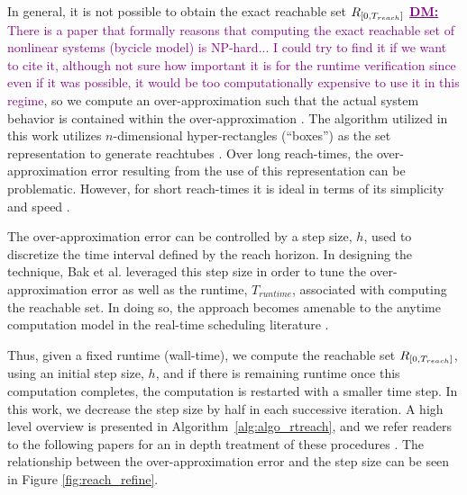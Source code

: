 \documentclass[manuscript,screen,review]{acmart}
\newcommand{\diego}[1]{\textcolor{purple}{\textbf{\underline{DM:}} #1}}
\begin{document}
In general, it is not possible to obtain the exact reachable set $\mathnormal{R}_{[0,T_{reach}]}$ \diego{There is a paper that formally reasons that computing the exact reachable set of nonlinear systems (bycicle model) is NP-hard... I could try to find it if we want to cite it, although not sure how important it is for the runtime verification since even if it was possible, it would be too computationally expensive to use it in this regime}, so we compute an over-approximation such that the actual system behavior is contained within the over-approximation \cite{Lin2020}. The algorithm utilized in this work utilizes $n$-dimensional hyper-rectangles (``boxes'') as the set representation to generate reachtubes \cite{Johnson2016}. Over long reach-times, the over-approximation error resulting from the use of this representation can be problematic. However, for short reach-times it is ideal in terms of its simplicity and speed \cite{Bak2014}.


The over-approximation error can be controlled by a step size, $h$, used to discretize the time interval defined by the reach horizon. In designing the technique, Bak et al. leveraged this step size in order to tune the over-approximation error as well as the runtime, $T_{runtime}$, associated with computing the reachable set. In doing so, the approach becomes amenable to the anytime computation model in the real-time scheduling literature \cite{Liu1991}.


Thus, given a fixed runtime (wall-time), we compute the reachable set $\mathnormal{R}_{[0,T_{reach}]}$, using an initial step size, $h$, and if there is remaining runtime once this computation completes, the computation is restarted with a smaller time step. In this work, we decrease the step size by half in each successive iteration. A high level overview is presented in Algorithm~\ref{alg:algo_rtreach}, and we refer readers to the following papers for an in depth treatment of these procedures \cite{dang2000,Bak2014,Johnson2016}. The relationship between the over-approximation error and the step size can be seen in Figure \ref{fig:reach_refine}.
\end{document}
